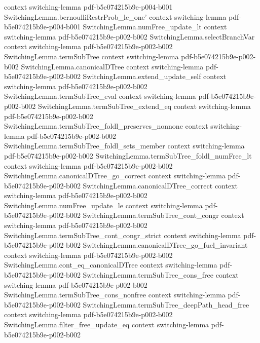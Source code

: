 \begin{theorem}
  {context}
  {switching-lemma}
  {pdf-b5e074215b9e-p004-b001}
\proofstep
  {SwitchingLemma.bernoulliRestrProb_le_one'}
  {context}
  {switching-lemma}
  {pdf-b5e074215b9e-p004-b001}
\proofstep
  {SwitchingLemma.numFree_update_lt}
  {context}
  {switching-lemma}
  {pdf-b5e074215b9e-p002-b002}
\proofstep
  {SwitchingLemma.selectBranchVar}
  {context}
  {switching-lemma}
  {pdf-b5e074215b9e-p002-b002}
\proofstep
  {SwitchingLemma.termSubTree}
  {context}
  {switching-lemma}
  {pdf-b5e074215b9e-p002-b002}
\proofstep
  {SwitchingLemma.canonicalDTree}
  {context}
  {switching-lemma}
  {pdf-b5e074215b9e-p002-b002}
\proofstep
  {SwitchingLemma.extend_update_self}
  {context}
  {switching-lemma}
  {pdf-b5e074215b9e-p002-b002}
\proofstep
  {SwitchingLemma.termSubTree_eval}
  {context}
  {switching-lemma}
  {pdf-b5e074215b9e-p002-b002}
\proofstep
  {SwitchingLemma.termSubTree_extend_eq}
  {context}
  {switching-lemma}
  {pdf-b5e074215b9e-p002-b002}
\proofstep
  {SwitchingLemma.termSubTree_foldl_preserves_nonnone}
  {context}
  {switching-lemma}
  {pdf-b5e074215b9e-p002-b002}
\proofstep
  {SwitchingLemma.termSubTree_foldl_sets_member}
  {context}
  {switching-lemma}
  {pdf-b5e074215b9e-p002-b002}
\proofstep
  {SwitchingLemma.termSubTree_foldl_numFree_lt}
  {context}
  {switching-lemma}
  {pdf-b5e074215b9e-p002-b002}
\proofstep
  {SwitchingLemma.canonicalDTree_go_correct}
  {context}
  {switching-lemma}
  {pdf-b5e074215b9e-p002-b002}
\proofstep
  {SwitchingLemma.canonicalDTree_correct}
  {context}
  {switching-lemma}
  {pdf-b5e074215b9e-p002-b002}
\proofstep
  {SwitchingLemma.numFree_update_le}
  {context}
  {switching-lemma}
  {pdf-b5e074215b9e-p002-b002}
\proofstep
  {SwitchingLemma.termSubTree_cont_congr}
  {context}
  {switching-lemma}
  {pdf-b5e074215b9e-p002-b002}
\proofstep
  {SwitchingLemma.termSubTree_cont_congr_strict}
  {context}
  {switching-lemma}
  {pdf-b5e074215b9e-p002-b002}
\proofstep
  {SwitchingLemma.canonicalDTree_go_fuel_invariant}
  {context}
  {switching-lemma}
  {pdf-b5e074215b9e-p002-b002}
\proofstep
  {SwitchingLemma.cont_eq_canonicalDTree}
  {context}
  {switching-lemma}
  {pdf-b5e074215b9e-p002-b002}
\proofstep
  {SwitchingLemma.termSubTree_cons_free}
  {context}
  {switching-lemma}
  {pdf-b5e074215b9e-p002-b002}
\proofstep
  {SwitchingLemma.termSubTree_cons_nonfree}
  {context}
  {switching-lemma}
  {pdf-b5e074215b9e-p002-b002}
\proofstep
  {SwitchingLemma.termSubTree_deepPath_head_free}
  {context}
  {switching-lemma}
  {pdf-b5e074215b9e-p002-b002}
\proofstep
  {SwitchingLemma.filter_free_update_eq}
  {context}
  {switching-lemma}
  {pdf-b5e074215b9e-p002-b002}

\end{theorem}
